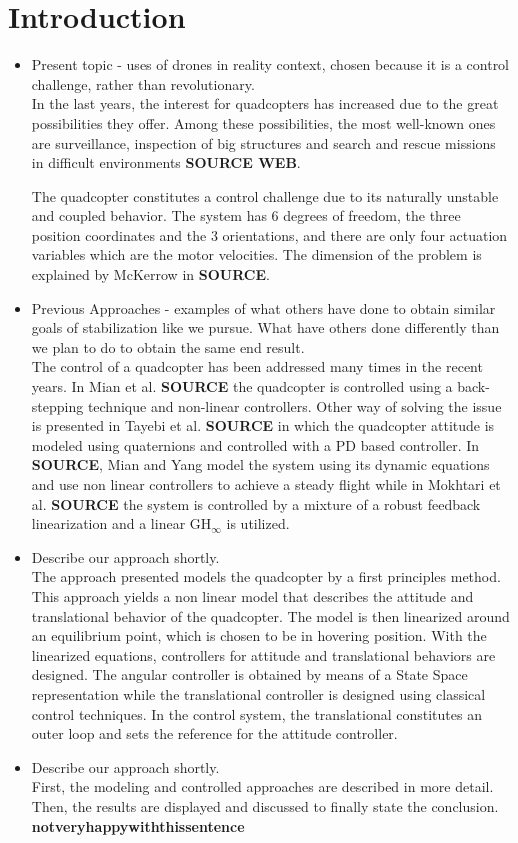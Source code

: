 \section{Introduction}
\begin{itemize}
\item Present topic - uses of drones in reality context, chosen because it is a control challenge, rather than revolutionary.\\
In the last years, the interest for quadcopters has increased due to the great possibilities they offer. Among these possibilities, the most well-known ones are surveillance, inspection of big structures and search and rescue missions in difficult environments \textbf{SOURCE WEB}.

The quadcopter constitutes a control challenge due to its naturally unstable and coupled behavior. The system has 6 degrees of freedom, the three position coordinates and the 3 orientations, and there are only four actuation variables which are the motor velocities. The dimension of the problem is explained by McKerrow in  \textbf{SOURCE}.

\item Previous Approaches - examples of what others have done to obtain similar goals of stabilization like we pursue. What have others done differently than we plan to do to obtain the same end result. \\ 
The control of a quadcopter has been addressed many times in the recent years. In Mian et al. \textbf{SOURCE} the quadcopter is controlled using a back-stepping technique and non-linear controllers. Other way of solving the issue is presented in Tayebi et al. \textbf{SOURCE} in which the quadcopter attitude is modeled using quaternions and controlled with a PD based controller. In \textbf{SOURCE}, Mian and Yang model the system using its dynamic equations and use non linear controllers to achieve a steady flight while in Mokhtari et al. \textbf{SOURCE} the system is controlled by a mixture of a robust feedback linearization and a linear GH$_{\infty}$ is utilized.

\item Describe our approach shortly.\\
The approach presented models the quadcopter by a first principles method. This approach yields a non linear model that describes the attitude and translational behavior of the quadcopter. The model is then linearized around an equilibrium point, which is chosen to be in hovering position. With the linearized equations, controllers for attitude and translational behaviors are designed. The angular controller is obtained by means of a State Space representation while the translational controller is designed using classical control techniques. In the control system, the translational constitutes an outer loop  and sets the reference for the attitude controller.
\item Describe our approach shortly.\\
First, the modeling and controlled approaches are described in more detail. Then, the results are displayed and discussed to finally state the conclusion. \textbf{notveryhappywiththissentence}
\end{itemize}

